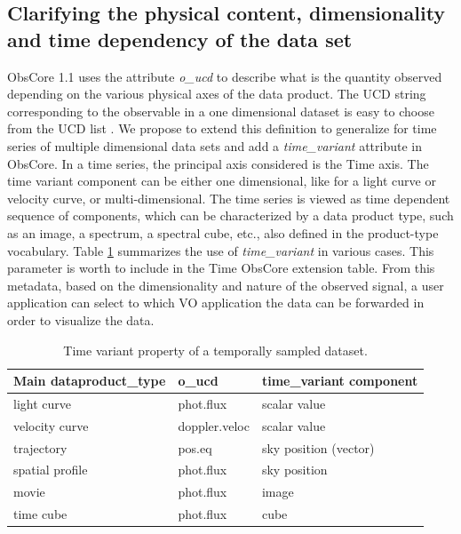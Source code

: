 \documentclass[11pt,a4paper]{ivoa}
\begin{document}
\subsection{Clarifying the physical content, dimensionality and time dependency of the data set}
\label{sec:timevariant}
ObsCore 1.1 uses the attribute \emph{o\_ucd} to describe what is the quantity observed depending on the various physical axes of the data product. The  UCD string corresponding to the observable in  a one dimensional dataset is  easy to choose from the UCD list \citep{2023ivoa.spec.0125C}.  We propose to extend this definition to generalize for time series of multiple dimensional data sets and add a \emph{time\_variant} attribute in ObsCore.
In a time series, the principal axis considered is the Time axis. The time variant component can be either one dimensional, like for a light curve or velocity curve, or multi-dimensional. The time series is viewed as  time dependent sequence of components, which can be characterized  by a data product type, such as an image, a spectrum, a spectral cube, etc., also  defined in the product-type vocabulary. Table \ref{tab:timevar} summarizes the use of \emph{ time\_variant}  in various cases.
This parameter is worth to include in the Time ObsCore extension table. From this metadata, based on the dimensionality and nature of the observed signal, a user application can select to which VO application the data can be forwarded in order to visualize the data.

\begin{table}[!htb]
   \begin{center}
  \caption{Time variant property of a temporally sampled dataset.  \label{tab:timevar} }

  \begin{small}
  \begin{tabular}{|l|l|l|}
\sptablerule
\textbf{Main dataproduct\_type} & \textbf{o\_ucd}  &\textbf{time\_variant component }   \\ \hline
light curve & phot.flux &  scalar value \\ \hline
velocity curve & doppler.veloc & scalar value \\ \hline
trajectory & pos.eq  &  sky position (vector) \\ \hline
spatial profile&  phot.flux & sky position \\ \hline
movie & phot.flux & image \\ \hline
time cube & phot.flux & cube \\ \hline
 \end{tabular}
  \end{small}
  \end{center}
 \end{table}
\end{document}
